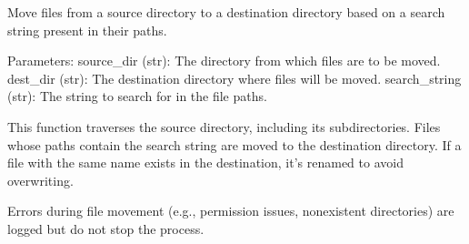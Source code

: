 \documentclass[letterpaper,10pt,english]{sphinxmanual}
\begin{document}
\begin{fulllineitems}
\label{\detokenize{akhdefo_functions:akhdefo_functions.Akhdefo_Tools.move_files_with_string}}
\pysigstartsignatures
{}
\pysigstopsignatures
\sphinxAtStartPar
Move files from a source directory to a destination directory based on a search string present in their paths.

\sphinxAtStartPar
Parameters:
\sphinxhyphen{} source\_dir (str): The directory from which files are to be moved.
\sphinxhyphen{} dest\_dir (str): The destination directory where files will be moved.
\sphinxhyphen{} search\_string (str): The string to search for in the file paths.

\sphinxAtStartPar
This function traverses the source directory, including its subdirectories. 
Files whose paths contain the search string are moved to the destination directory. 
If a file with the same name exists in the destination, it’s renamed to avoid overwriting.

\sphinxAtStartPar
Errors during file movement (e.g., permission issues, non\sphinxhyphen{}existent directories) are logged but do not stop the process.

\end{fulllineitems}

\end{document}
